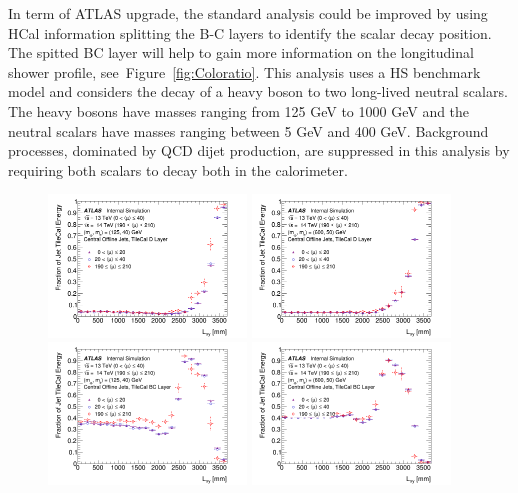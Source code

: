 In term of ATLAS upgrade, the standard analysis could be improved by using  HCal information splitting the B-C layers to identify the scalar decay position.
The spitted BC layer will help to gain more information on the longitudinal shower profile, see~Figure~\ref{fig:Coloratio}.
This analysis uses a HS benchmark model and considers the decay of a heavy boson to two long-lived neutral scalars. The heavy bosons have masses ranging from 125 GeV to 1000 GeV and the neutral scalars have masses ranging between 5 GeV and 400 GeV.
Background processes, dominated by QCD dijet production, are suppressed in this analysis by requiring both scalars to decay both in the calorimeter.

\begin{figure}[hbtp]
\begin{center}
\includegraphics[width=0.47\textwidth]{figures/caloratio1.png}
\includegraphics[width=0.47\textwidth]{figures/caloratio2.png}\\
\includegraphics[width=0.47\textwidth]{figures/caloratio3.png}
\includegraphics[width=0.47\textwidth]{figures/caloratio4.png}\\
\caption{ }
\label{fig:Caloratio}
\end{center}
\end{figure}



